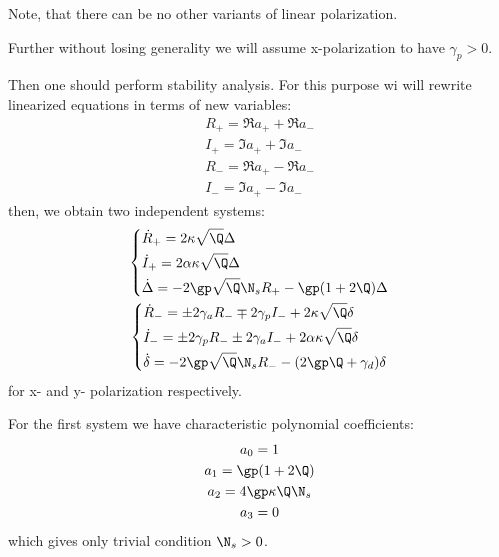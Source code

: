 \documentclass[12pt, notitlepage]{report}
\begin{document}
Note, that there can be no other variants of linear polarization. 

Further without losing generality we will assume x-polarization to have $\gamma_p > 0$.

Then one should perform stability analysis. For this purpose wi will rewrite linearized equations in terms of new variables:
\begin{gather}
	R_+ = \Re a_+ + \Re a_- \\
	I_+ = \Im a_+ + \Im a_- \\
	R_- = \Re a_+ - \Re a_- \\
	I_- = \Im a_+ - \Im a_-
\end{gather}
then, we obtain two independent systems:
\begin{gather}
	\left\{\begin{align}
		&\dot{R}_+ = 2\kappa\sqrt{\Q}\Delta \\
		&\dot{I}_+ = 2\alpha\kappa\sqrt{\Q}\Delta \\
		&\dot{\Delta} = -2\gp\sqrt{\Q}\N_s R_+ - \gp(1+2\Q)\Delta
	\end{align}\right.\\
	\left\{\begin{align}
		&\dot{R}_- = \pm2\gamma_a R_- \mp 2\gamma_p I_- + 2\kappa\sqrt{\Q}\delta \\
		&\dot{I}_- = \pm2\gamma_p R_- \pm 2\gamma_a I_- + 2\alpha\kappa\sqrt{\Q}\delta \\
		&\dot{\delta} = -2\gp\sqrt{\Q}\N_s R_- - (2\gp\Q + \gamma_d)\delta
	\end{align}\right.
\end{gather}
for x- and y- polarization respectively.

For the first system we have characteristic polynomial coefficients:
\begin{gather}
	a_0 = 1\\
	a_1 = \gp(1+2\Q)\\
	a_2 = 4\gp\kappa\Q\N_s \\
	a_3 = 0
\end{gather}
which gives only trivial condition $\N_s > 0$.
\end{document}
